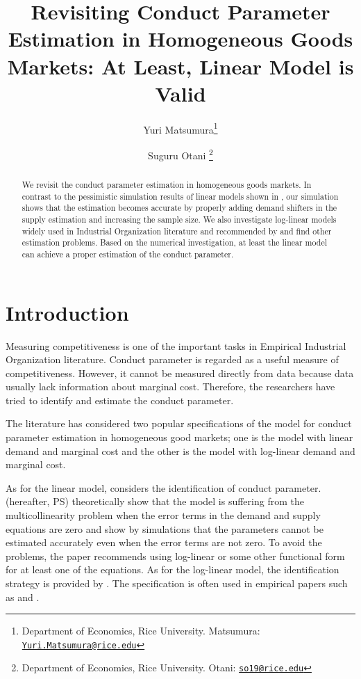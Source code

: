 \documentclass[11pt, a4paper]{article}
\title{Revisiting Conduct Parameter Estimation in Homogeneous Goods Markets: At Least, Linear Model is Valid}
\author{Yuri Matsumura\footnote{Department of Economics, Rice University. Matsumura: \texttt{\href{mailto:Yuri.Matsumura@rice.edu}{Yuri.Matsumura@rice.edu}}} \and Suguru Otani \footnote{Department of Economics, Rice University. Otani: \texttt{\href{mailto:so19@rice.edu}{so19@rice.edu}}}}
\begin{document}
\maketitle

\begin{abstract}
    We revisit the conduct parameter estimation in homogeneous goods markets. In contrast to the pessimistic simulation results of linear models shown in \cite{perloff2012collinearity}, our simulation shows that the estimation becomes accurate by properly adding demand shifters in the supply estimation and increasing the sample size. We also investigate log-linear models widely used in Industrial Organization literature and recommended by \cite{perloff2012collinearity} and find other estimation problems. Based on the numerical investigation, at least the linear model can achieve a proper estimation of the conduct parameter.
\end{abstract}

\section{Introduction}

Measuring competitiveness is one of the important tasks in Empirical Industrial Organization literature.
Conduct parameter is regarded as a useful measure of competitiveness. 
However, it cannot be measured directly from data because data usually lack information about marginal cost.
Therefore, the researchers have tried to identify and estimate the conduct parameter.

The literature has considered two popular specifications of the model for conduct parameter estimation in homogeneous good markets; one is the model with linear demand and marginal cost and the other is the model with log-linear demand and marginal cost.

As for the linear model, \citet{bresnahan1982oligopoly} considers the identification of conduct parameter. 
\citet{perloff2012collinearity} (hereafter, PS) theoretically show that the model is suffering from the multicollinearity problem when the error terms in the demand and supply equations are zero and show by simulations that the parameters cannot be estimated accurately even when the error terms are not zero.
To avoid the problems, the paper recommends using log-linear or some other functional form for at least one of the equations.
As for the log-linear model, the identification strategy is provided by \citet{lau1982identifying}. 
The specification is often used in empirical papers such as \cite{okazaki2022excess} and \cite{merel2009measuring}.
\end{document}
